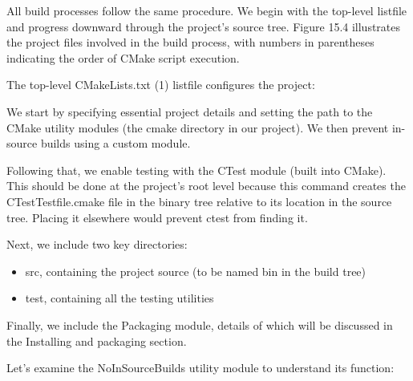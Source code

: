 
All build processes follow the same procedure. We begin with the top-level listfile and progress downward through the project’s source tree. Figure 15.4 illustrates the project files involved in the build process, with numbers in parentheses indicating the order of CMake script execution.


The top-level CMakeLists.txt (1) listfile configures the project:



We start by specifying essential project details and setting the path to the CMake utility modules (the cmake directory in our project). We then prevent in-source builds using a custom module.

Following that, we enable testing with the CTest module (built into CMake). This should be done at the project’s root level because this command creates the CTestTestfile.cmake file in the binary tree relative to its location in the source tree. Placing it elsewhere would prevent ctest from finding it.

Next, we include two key directories:

\begin{itemize}
\item
src, containing the project source (to be named bin in the build tree)

\item
test, containing all the testing utilities
\end{itemize}

Finally, we include the Packaging module, details of which will be discussed in the Installing and packaging section.

Let’s examine the NoInSourceBuilds utility module to understand its function:


